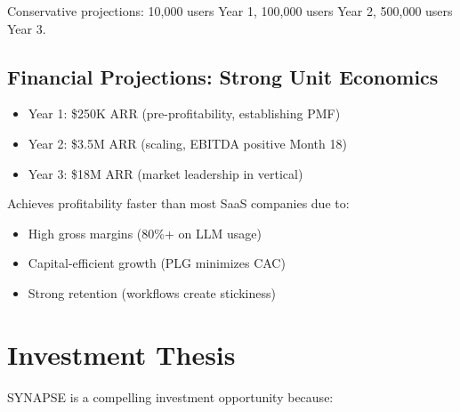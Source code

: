 \documentclass{report}
\begin{document}
Conservative projections: 10,000 users Year 1, 100,000 users Year 2, 500,000 users Year 3.

\subsection{Financial Projections: Strong Unit Economics}

\begin{itemize}
    \item Year 1: \$250K ARR (pre-profitability, establishing PMF)
    \item Year 2: \$3.5M ARR (scaling, EBITDA positive Month 18)
    \item Year 3: \$18M ARR (market leadership in vertical)
\end{itemize}

Achieves profitability faster than most SaaS companies due to:
\begin{itemize}
    \item High gross margins (80\%+ on LLM usage)
    \item Capital-efficient growth (PLG minimizes CAC)
    \item Strong retention (workflows create stickiness)
\end{itemize}

\section{Investment Thesis}

SYNAPSE is a compelling investment opportunity because:
\end{document}
